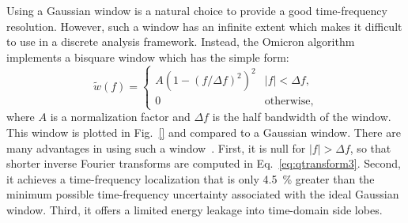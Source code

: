 Using a Gaussian window is a natural choice to provide a good time-frequency resolution. However, such a window has an infinite extent which makes it difficult to use in a discrete analysis framework. Instead, the Omicron algorithm implements a bisquare window which has the simple form:
\begin{equation}
  \tilde{w}(f) = 
  \begin{cases}
    A\left(1 - (f/\Delta f)^2 \right)^2 & |f| < \Delta f, \\
    0 & \textrm{otherwise},
  \end{cases}
  \label{eq:bisquare}
\end{equation}
where $A$ is a normalization factor and $\Delta f$ is the half bandwidth of the window. This window is plotted in Fig.~\ref{} and compared to a Gaussian window. There are many advantages in using such a window~\cite{Chatterji:2004}. First, it is null for $|f| > \Delta f$, so that shorter inverse Fourier transforms are computed in Eq.~\ref{eq:qtransform3}. Second, it achieves a time-frequency localization that is only 4.5~\% greater than the minimum possible time-frequency uncertainty associated with the ideal Gaussian window. Third, it offers a limited energy leakage into time-domain side lobes.


